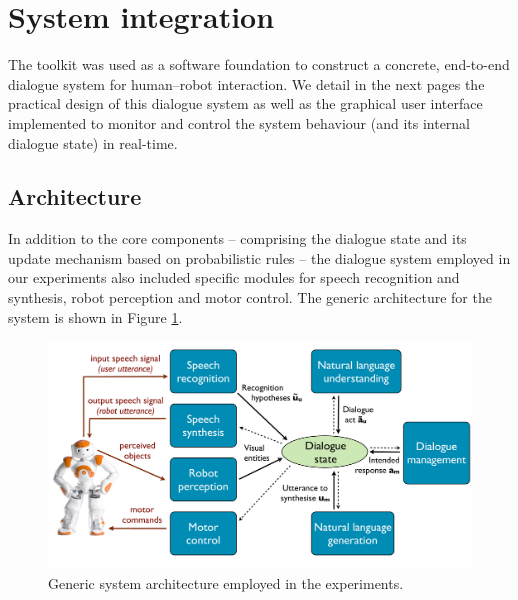 
\section{System integration}
\label{sec:system-integration}
The \opendial{} toolkit was used as a software foundation to construct a concrete, end-to-end dialogue system for human--robot interaction.  We detail in the next pages the practical design of this dialogue system as well as the graphical user interface implemented to monitor and control the system behaviour (and its internal dialogue state) in real-time. 
\subsection{Architecture}

In addition to the \opendial{} core components -- comprising the dialogue state and its update mechanism based on probabilistic rules -- the dialogue system employed in our experiments also included specific modules for speech recognition and synthesis, robot perception and motor control.  The generic architecture for the system is shown in Figure \ref{fig:impl_architecture}. 

\begin{figure}[ht]
\centering
\includegraphics[scale=0.30]{imgs/impl_architecture.pdf}
\caption{Generic system architecture employed in the experiments.}
\label{fig:impl_architecture}
\end{figure}

